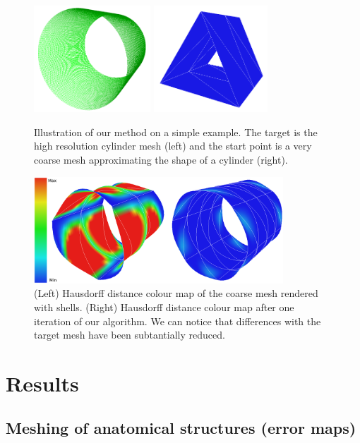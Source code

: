 \documentclass{llncs}
\begin{document}
\begin{figure}
\centering
\includegraphics[height=4cm]{images/cylinderHighWireframe}
\includegraphics[height=4cm]{images/cylinderLow}
\caption {Illustration of our method on a simple example. The target is the high resolution cylinder mesh (left) and the start point is a very coarse mesh approximating the shape of a cylinder (right).}
\label{fig-cylinder}
\end{figure}

\begin{figure}
\centering
\includegraphics[height=4cm]{images/cylinderResults2}
\caption {(Left) Hausdorff distance colour map of the coarse mesh rendered with shells. (Right) Hausdorff distance colour map after one iteration of our algorithm. We can notice that differences with the target mesh have been subtantially reduced.}
\label{fig-cylinderResults}
\end{figure}

\section{Results}
\subsection{Meshing of anatomical structures (error maps)}
\end{document}

